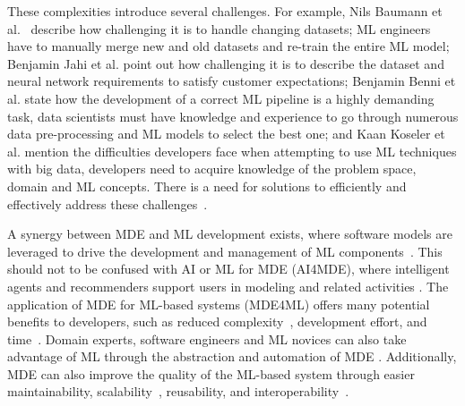 These complexities introduce several challenges. For example, Nils Baumann et al.~\cite{baumann2022dynamic} describe how challenging it is to handle changing datasets; ML engineers have to manually merge new and old datasets and re-train the entire ML model;  Benjamin Jahi et al. \cite{jahic2023semkis} point out how challenging it is to describe the dataset and neural network requirements to satisfy customer expectations;  Benjamin Benni et al. \cite{benni2019devops} state how the development of a correct ML pipeline is a highly demanding task, data scientists must have knowledge and experience to go through numerous data pre-processing and ML models to select the best one; and Kaan Koseler et al. \cite{koseler2019realization} mention the difficulties developers face when attempting to use ML techniques with big data, developers need to acquire knowledge of the problem space, domain and ML concepts. There is a need for solutions to efficiently and effectively address these challenges~\cite{raedler2023model}.

A synergy between MDE and ML development exists, where software models are leveraged to drive the development and management of ML components~\cite{safdar2022modlf, yohannis2022towards, kourouklidis2021model}. This should not to be confused with AI or ML for MDE (AI4MDE), where intelligent agents and recommenders support users in modeling and related activities \cite{almonte2021recommender, gil2021artificial, boubekeur2020towards, saini2019teaching}. The application of MDE for ML-based systems (MDE4ML) offers many potential benefits to developers, such as reduced complexity~\cite{kourouklidis2021model, bucchiarone2020grand}, development effort, and time~\cite{yohannis2022towards,gatto2019modeling}. Domain experts, software engineers and ML novices can also take advantage of ML through the abstraction and automation of MDE \cite{shi2022feature,moin2022supporting, bucchiarone2020grand}. Additionally, MDE can also improve the quality of the ML-based system through easier maintainability, scalability~\cite{selic2003pragmatics}, reusability, and interoperability~\cite{brambilla2017model}.


